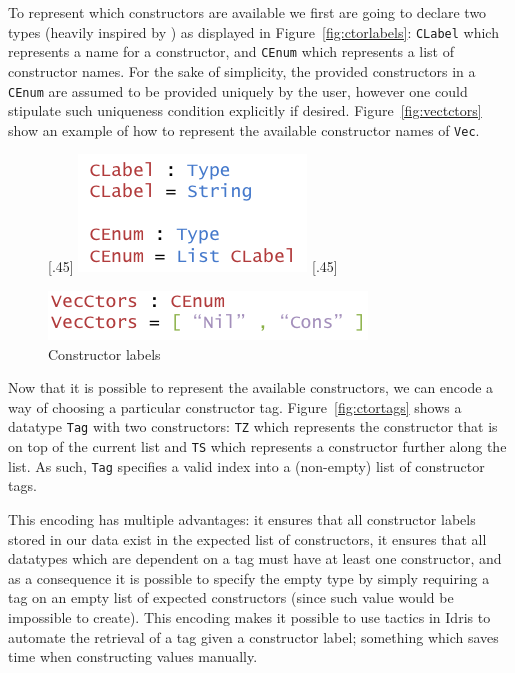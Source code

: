 \documentclass{ituthesis}
\newcommand{\ttconstructor}[1]{\textcolor{constructor-color}{\texttt{#1}}}
\newcommand{\tttype}[1]{\textcolor{type-color}{\texttt{#1}}}
\newcommand{\ttdec}[1]{\textcolor{declared-var-color}{\texttt{#1}}}
\theoremstyle{break}
\begin{document}
To represent which constructors are available we first are going to declare two types (heavily inspired by \textcite{Dagand2013acosmology,diehl2014eliminators}) as displayed in Figure~\ref{fig:ctorlabels}: \ttdec{CLabel} which represents a name for a constructor, and \ttdec{CEnum} which
represents a list of constructor names. For the sake of simplicity, the provided constructors in a \ttdec{CEnum} are assumed to be provided uniquely by the user, however one could stipulate such uniqueness condition explicitly if desired.
Figure~\ref{fig:vectctors} show an example of how to represent the available constructor names of \tttype{Vec}.


\begin{figure}[ht]
\begin{center}
  [.45\textwidth]{
    \includegraphics[scale=0.5]{Figures/AnInformativeEncodingofConstructorsLabels.png}
}
[.45\textwidth]{
    \includegraphics[scale=0.5]{Figures/VectorConstructors.png}

}
\caption{Constructor labels}
\end{center}
\end{figure}

Now that it is possible to represent the available constructors, we can encode a way of choosing a particular constructor tag. Figure~\ref{fig:ctortags} shows a datatype \tttype{Tag} with two constructors:
\ttconstructor{TZ} which represents the constructor that is on top of the current list and \ttconstructor{TS} which represents a constructor further along the list. As such, \tttype{Tag} specifies a valid index into a (non-empty) list of constructor tags.

This encoding has multiple advantages: it ensures that all constructor labels stored in our data exist in the expected list of constructors, it ensures that all datatypes which are dependent on a tag must have at least one constructor, and as a consequence
it is possible to specify the empty type by simply requiring a tag on an empty list of expected constructors (since such value would be impossible to create).
This encoding makes it possible to use tactics in Idris to automate the retrieval of a tag given a constructor label; something which saves time when constructing
values manually.
\end{document}
